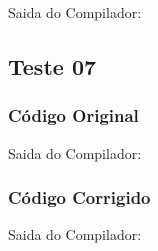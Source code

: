 Saida do Compilador:




\subsection{Teste 07}
\label{subsec:sintaticoTeste07}

\subsubsection{Código Original}


Saida do Compilador:




\subsubsection{Código Corrigido}


Saida do Compilador:


